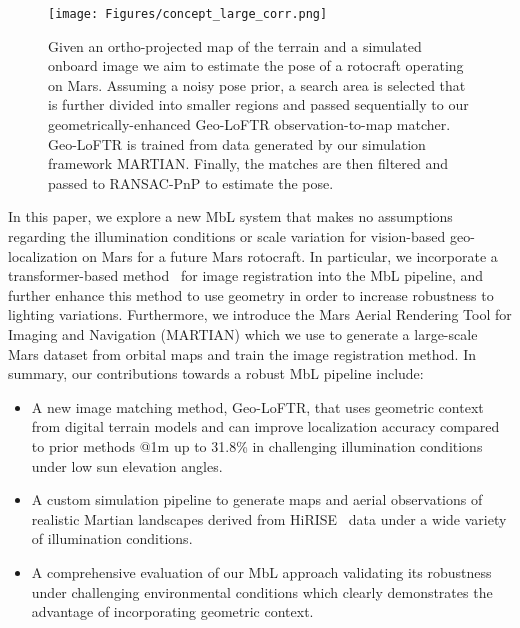 \begin{figure*}
    \setlength{\abovecaptionskip}{0pt}
    \setlength{\belowcaptionskip}{0pt}
    \centering
    \texttt{[image: Figures/concept\_large\_corr.png]}
    \caption{Given an ortho-projected map of the terrain and a simulated onboard image we aim to estimate the pose of a rotocraft operating on Mars. Assuming a noisy pose prior, a search area is selected that is further divided into smaller regions and passed sequentially to our geometrically-enhanced Geo-LoFTR observation-to-map matcher. Geo-LoFTR is trained from data generated by our simulation framework MARTIAN. Finally, the matches are then filtered and passed to RANSAC-PnP to estimate the pose.}
    \label{fig:CONCEPT}
\end{figure*}


In this paper, we explore a new MbL system that makes no assumptions regarding the illumination conditions or scale variation for vision-based geo-localization on Mars for a future Mars rotocraft. In particular, we incorporate a transformer-based method~\cite{loftr} for image registration into the MbL pipeline, and further enhance this method to use geometry in order to increase robustness to lighting variations. Furthermore, we introduce the Mars Aerial Rendering Tool for Imaging and Navigation (MARTIAN) which we use to generate a large-scale Mars dataset from orbital maps and train the image registration method.
In summary, our contributions towards a robust MbL pipeline include:
\begin{itemize}
    \item A new image matching method, Geo-LoFTR, that uses geometric context from digital terrain models and can improve localization accuracy compared to prior methods @1m up to 31.8\% in challenging illumination conditions under low sun elevation angles. 
    \item A custom simulation pipeline to generate maps and aerial observations of realistic Martian landscapes derived from HiRISE~\cite{hirise} data under a wide variety of illumination conditions.  
    \item A comprehensive evaluation of our MbL approach validating its robustness under challenging environmental conditions which clearly demonstrates the advantage of incorporating geometric context. 
\end{itemize}



